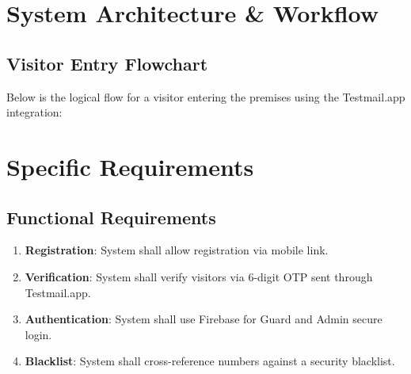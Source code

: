 \documentclass[12pt,a4paper]{article}
\begin{document}
\section{System Architecture \& Workflow}

\subsection{Visitor Entry Flowchart}
Below is the logical flow for a visitor entering the premises using the Testmail.app integration:

\begin{center}
\end{center}

\section{Specific Requirements}
\subsection{Functional Requirements}
\begin{enumerate}[label=FR.\arabic*]
    \item \textbf{Registration}: System shall allow registration via mobile link.
    \item \textbf{Verification}: System shall verify visitors via 6-digit OTP sent through Testmail.app.
    \item \textbf{Authentication}: System shall use Firebase for Guard and Admin secure login.
    \item \textbf{Blacklist}: System shall cross-reference numbers against a security blacklist.
\end{enumerate}
\end{document}
